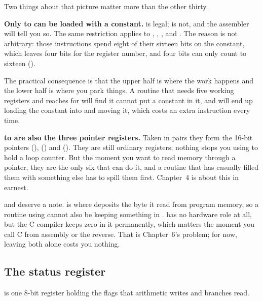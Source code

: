 
Two things about that picture matter more than the other thirty.

\textbf{Only  to  can be loaded with a constant.}  is
legal;  is not, and the assembler will tell you so. The same restriction
applies to , , ,  and . The reason is not
arbitrary: those instructions spend eight of their sixteen bits on the constant, which leaves
four bits for the register number, and four bits can only count to sixteen
().

The practical consequence is that the upper half is where the work happens and the lower half is
where you park things. A routine that needs five working registers and reaches for 
will find it cannot put a constant in it, and will end up loading the constant into  and
moving it, which costs an extra instruction every time.

\textbf{ to  are also the three pointer registers.} Taken in pairs they form
the 16-bit pointers  (),  () and 
(). They are still ordinary registers; nothing stops you using  to hold a
loop counter. But the moment you want to read memory through a pointer, they are the only six
that can do it, and a routine that has casually filled them with something else has to spill them
first. Chapter~4 is about this in earnest.

 and  deserve a note.  is where  deposits the byte it read
from program memory, so a routine using  cannot also be keeping something in .
 has no hardware role at all, but the C compiler keeps zero in it permanently, which
matters the moment you call C from assembly or the reverse. That is Chapter~6's problem; for now,
leaving both alone costs you nothing.

\subsection{The status register}
\label{c1:sec:sreg}
 is one 8-bit register holding the flags that arithmetic writes and branches read.

